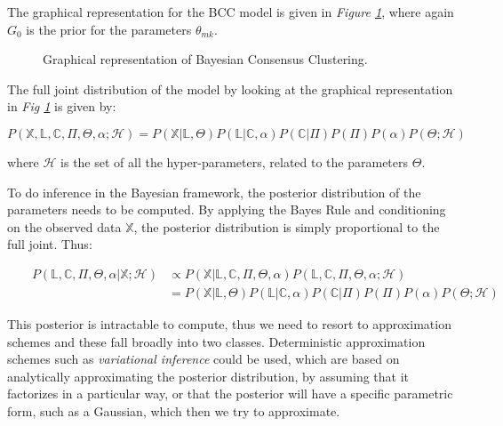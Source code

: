 The graphical representation for the BCC model is given in \emph{Figure \ref{bcc-pic}}, where again $G_{0}$ is the prior for the parameters $\theta_{mk}$.

\begin{figure}[ht]
  \begin{center}
      
  \caption{Graphical representation of Bayesian Consensus Clustering.}
  \label{bcc-pic}
  \end{center}
\end{figure}

The full joint distribution of the model by looking at the graphical representation in \emph{Fig \ref{bcc-pic}} is given by:

\begin{equation}\scriptstyle
	P(\mathbb{X}, \mathbb{L}, \mathbb{C}, \Pi , \Theta , \alpha ; \mathcal{H}) = P(\mathbb{X}|\mathbb{L},\Theta) P(\mathbb{L}|\mathbb{C},\alpha) P(\mathbb{C}|\Pi) P(\Pi) P(\alpha) P(\Theta ; \mathcal{H})
\end{equation}

where $\mathcal{H}$ is the set of all the hyper-parameters, related to the parameters $\Theta$. 

To do inference in the Bayesian framework, the posterior distribution of the parameters needs to be computed. By applying the Bayes Rule and conditioning on the observed data $\mathbb{X}$, the posterior distribution is simply proportional to the full joint. Thus:
 
\begin{equation}\scriptstyle
	\begin{aligned}
	& & \scriptstyle P(\mathbb{L},\mathbb{C},\Pi ,\Theta , \alpha | \mathbb{X}; \mathcal{H}) & \scriptstyle \propto P(\mathbb{X}|\mathbb{L}, \mathbb{C},\Pi ,\Theta , \alpha) P(\mathbb{L}, \mathbb{C}, \Pi , \Theta , \alpha; \mathcal{H}) \\
	& & & \scriptstyle = P(\mathbb{X}|\mathbb{L},\Theta) P(\mathbb{L}|\mathbb{C},\alpha) P(\mathbb{C}|\Pi) P(\Pi) P(\alpha) P(\Theta ; \mathcal{H})
	\end{aligned}
\end{equation}

This posterior is intractable to compute, thus we need to resort to approximation schemes and these fall broadly into two classes. Deterministic approximation schemes such as \emph{variational inference} could be used, which are based on analytically approximating the posterior distribution, by assuming that it factorizes in a particular way, or that the posterior will have a specific parametric form, such as a Gaussian, which then we try to approximate.

